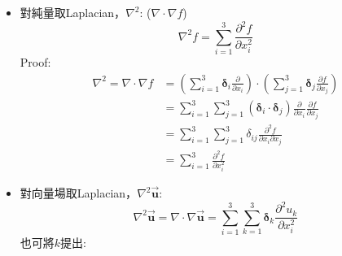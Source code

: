 \documentclass[../main.tex]{subfiles}
\begin{document}
\begin{itemize}
\begin{itemize}
\begin{align}
          \nabla \cdot \overline{\overline{\bm \tau}} &=
          \left(
            \sum_{i=1}^3 \bm \delta_i \frac{\partial}{\partial x_i}
          \right) \cdot
          \left(
            \sum_{j=1}^3 \sum_{k=1}^3 \bm \delta_j \bm \delta_k \tau_{jk}
          \right) \nonumber\\
          &= \sum_{i=1}^3 \sum_{j=1}^3 \sum_{k=1}^3
          \left[\left(
            \bm \delta_i \cdot \bm \delta_j
          \right) \bm \delta_k\right] \frac{\partial \tau_{jk}}{\partial x_i} \nonumber\\
          &= \sum_{i=1}^3 \sum_{j=1}^3 \sum_{k=1}^3
          \delta_{ij} \bm \delta_k
          \frac{\partial \tau_{jk}}{\partial x_i} \nonumber\\
          &= \sum_{i=1}^3 \sum_{k=1}^3 \bm \delta_k
          \frac{\partial \tau_{ik}}{\partial x_i}
        \end{align}
      \item 對純量取Laplacian，$\nabla^2$: ($\nabla \cdot \nabla f$)
        \begin{equation}
          \boxed{\nabla^2 f = \sum_{i=1}^3 \frac{\partial^2 f}{\partial x_i^2}}
        \end{equation}
        Proof:
        \begin{align}
         \nabla^2 =  \nabla \cdot \nabla f &=
          \left(
            \sum_{i=1}^3 \bm \delta_i \frac{\partial}{\partial x_i}
          \right) \cdot
          \left(
            \sum_{j=1}^3 \bm \delta_j \frac{\partial f}{\partial x_j}
          \right) \nonumber\\
          &= \sum_{i=1}^3 \sum_{j=1}^3
          \left(
            \bm \delta_i \cdot \bm \delta_j
          \right) \frac{\partial}{\partial x_i} \frac{\partial f}{\partial x_j} \nonumber\\
          &= \sum_{i=1}^3 \sum_{j=1}^3
          \delta_{ij} \frac{\partial^2 f}{\partial x_i \partial x_j} \nonumber\\
          &= \sum_{i=1}^3 \frac{\partial^2 f}{\partial x_i^2}
        \end{align}
      \item 對向量場取Laplacian，$\nabla^2 \vec {\bm u}$:
        \begin{equation}
          \boxed{\nabla^2 \vec {\bm u}  = \nabla \cdot \nabla \vec {\bm u}
          = \sum_{i=1}^3\sum_{k=1}^3 \bm \delta_k \frac{\partial^2 u_k}{\partial x_i^2}}
        \end{equation}
        也可將$k$提出:
        \begin{equation}

\end{equation}
\end{itemize}
\end{itemize}
\end{document}
